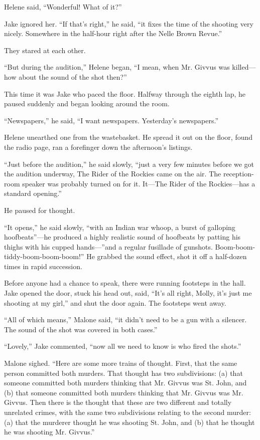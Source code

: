 \documentclass{novel}
\begin{document}
Helene said, “Wonderful! What of it?”

Jake ignored her. “If that’s right,” he said, “it fixes the time of the shooting very nicely. Somewhere in the half-hour right after the Nelle Brown Revue.”

They stared at each other.

“But during the audition,” Helene began, “I mean, when Mr. Givvus was killed—how about the sound of the shot then?”

This time it was Jake who paced the floor. Halfway through the eighth lap, he paused suddenly and began looking around the room.

“Newspapers,” he said, “I want newspapers. Yesterday’s newspapers.”

Helene unearthed one from the wastebasket. He spread it out on the floor, found the radio page, ran a forefinger down the afternoon’s listings.

“Just before the audition,” he said slowly, “just a very few minutes before we got the audition underway, The Rider of the Rockies came on the air. The reception-room speaker was probably turned on for it. It—The Rider of the Rockies—has a standard opening.”

He paused for thought.

“It opens,” he said slowly, “with an Indian war whoop, a burst of galloping hoofbeats”—he produced a highly realistic sound of hoofbeats by patting his thighs with his cupped hands—”and a regular fusillade of gunshots. Boom-boom-tiddy-boom-boom-boom!” He grabbed the sound effect, shot it off a half-dozen times in rapid succession.

Before anyone had a chance to speak, there were running footsteps in the hall. Jake opened the door, stuck his head out, said, “It’s all right, Molly, it’s just me shooting at my girl,” and shut the door again. The footsteps went away.

“All of which means,” Malone said, “it didn’t need to be a gun with a silencer. The sound of the shot was covered in both cases.”

“Lovely,” Jake commented, “now all we need to know is who fired the shots.”

Malone sighed. “Here are some more trains of thought. First, that the same person committed both murders. That thought has two subdivisions: (a) that someone committed both murders thinking that Mr. Givvus was St. John, and (b) that someone committed both murders thinking that Mr. Givvus was Mr. Givvus. Then there is the thought that these are two different and totally unrelated crimes, with the same two subdivisions relating to the second murder: (a) that the murderer thought he was shooting St. John, and (b) that he thought he was shooting Mr. Givvus.”
\end{document}
